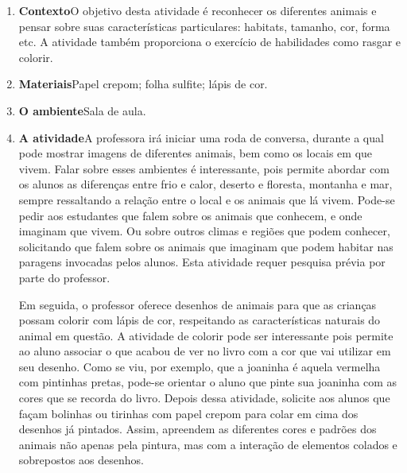 \documentclass[11pt]{extarticle}
\begin{document}
\begin{enumerate}
\item \textbf{Contexto}\quad O objetivo desta atividade é reconhecer os diferentes animais e pensar sobre suas características particulares: habitats, tamanho, cor, forma etc.
A atividade também proporciona o exercício de habilidades como rasgar e colorir.  

\item \textbf{Materiais}\quad Papel crepom; folha sulfite; lápis de cor.

\item \textbf{O ambiente}\quad Sala de aula. 

\item \textbf{A atividade}\quad A professora irá iniciar uma roda de conversa, durante a qual pode mostrar imagens de diferentes animais, bem como os locais em que vivem.
Falar sobre esses ambientes é interessante, pois permite abordar com os alunos as diferenças entre frio e calor, deserto e floresta, montanha e mar, sempre ressaltando a relação entre o local e os animais que lá vivem. Pode-se pedir aos estudantes que falem sobre os animais que conhecem, e onde imaginam que vivem. Ou sobre outros climas e regiões que podem conhecer, solicitando que falem sobre os animais que imaginam que podem habitar nas paragens invocadas pelos alunos.
Esta atividade requer pesquisa prévia por parte do professor.

Em seguida, o professor oferece desenhos de animais para que as crianças possam colorir com lápis de cor, respeitando as características naturais do animal em questão.
A atividade de colorir pode ser interessante pois permite ao aluno associar o que acabou de ver no livro com a cor que vai utilizar em seu desenho. Como se viu, por exemplo, que a joaninha é aquela vermelha com pintinhas pretas, pode-se orientar o aluno que pinte sua joaninha com as cores que se recorda do livro.
Depois dessa atividade, solicite aos alunos que façam bolinhas ou tirinhas com papel crepom para colar em cima dos desenhos já pintados. Assim, apreendem as diferentes cores e padrões dos animais não apenas pela pintura, mas com a interação de elementos colados e sobrepostos aos desenhos.


\end{enumerate}
\end{document}
